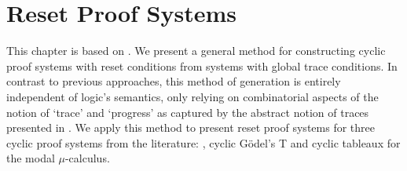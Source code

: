 
\chapter{Reset Proof Systems}
\label{chap:reset}

This chapter is based on \needcite{}.
We present a general method for constructing cyclic proof systems with reset conditions from systems with global trace conditions.
In contrast to previous approaches, this method of generation is entirely
independent of logic's semantics, only relying on
combinatorial aspects of the notion of `trace' and `progress' as captured by the
abstract notion of traces presented in .
We apply this method to present reset proof systems for three cyclic proof
systems from the literature: 
, %
cyclic Gödel's T %
and cyclic tableaux for the modal
$\mu$-calculus.



